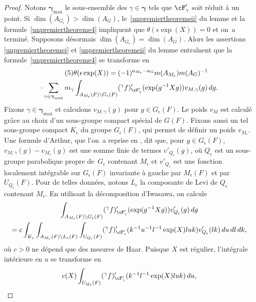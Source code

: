 \begin{proof}
Notons $\boldsymbol{\gamma}_{\max}$ le sous-ensemble des $\gamma\in \boldsymbol{\gamma}$ tels que $\cF'_{\gamma}$ soit réduit à un point. Si $\dim(A_{G_{\epsilon}})\!>\!\dim(A_{G})$, le~\eqref{unpremiertheoremeii} du lemme et la formule~\eqref{unpremiertheoreme4} impliquent que \hbox{$\theta(\epsilon \exp(X))\!=\!0$} et on~a terminé. Supposons désormais $\dim(A_{G_{\epsilon}})=\dim(A_{G})$. Alors les assertions \eqref{unpremiertheoremei} et \eqref{unpremiertheoremeii} du lemme entraînent que la formule~\eqref{unpremiertheoreme4} se transforme en
\begin{multline*}\tag{5}\label{unpremiertheoreme5}
\theta(\epsilon \exp(X))=(-1)^{a_{M_{\epsilon}}-a_{G}}m(A_{M_{\epsilon}})m(A_{G})^{-1}\\
\cdot\sum_{\gamma\in \boldsymbol{\gamma}_{\max}}m_{\gamma}
\int_{A_{M_{\epsilon}}(F)\backslash G_{\epsilon}(F)}(^{\gamma}f)'_{\cF'_{\gamma}}(\exp(g^{-1}X g))v_{M,\gamma} (g)\,dg.
\end{multline*}
Fixons $\gamma\in \boldsymbol{\gamma}_{\max}$ et calculons $v_{M,\gamma}(g)$ pour $g\in G_{\epsilon}(F)$. Le poids $v_{M}$ est calculé grâce au choix d'un sous-groupe compact spécial de $G(F)$. Fixons aussi un tel sous-groupe compact $K_{\epsilon}$ du groupe $G_{\epsilon}(F)$, qui permet de définir un poids $v_{M_{\epsilon}}$. Une formule d'Arthur, que l'on~a reprise en \cite[Lem.\,3.3]{W1}, dit que, pour $g\in G_{\epsilon}(F)$, $v_{M,\gamma}(g)-v_{M_{\epsilon}}(g)$ est une somme finie de termes $v'_{Q_{\epsilon}}(g)$, où $Q_{\epsilon}$ est un sous-groupe parabolique propre de~$G_{\epsilon}$ contenant $M_{\epsilon}$ et $v'_{Q_{\epsilon}}$ est une fonction localement intégrable sur $G_{\epsilon}(F)$ invariante à gauche par $M_{\epsilon}(F)$ et par $U_{Q_{\epsilon}}(F)$. Pour de telles données, notons $L_{\epsilon}$ la composante de Levi de $Q_{\epsilon}$ contenant $M_{\epsilon}$. En utilisant la décomposition d'Iwasawa, on calcule
\begin{multline*}
\int_{A_{M_{\epsilon}}(F)\backslash G_{\epsilon}(F)}(^{\gamma}f)'_{\cF'_{\gamma}}(\exp(g^{-1}X g))v_{Q_{\epsilon}}' (g)\,dg\\
=c\int_{K_{\epsilon}}\int_{A_{M_{\epsilon}}(F)\backslash L_{\epsilon}(F)}\int_{U_{Q_{\epsilon}}(F)}(^{\gamma}f)'_{\cF'_{\gamma}}(k^{-1}u^{-1}l^{-1}\exp(X)luk)v'_{Q_{\epsilon}}(lk)\,du\,dl\,dk,
\end{multline*}
où $c>0$ ne dépend que des mesures de Haar. Puisque $X$ est régulier, l'intégrale intérieure en $u$ se transforme en
\[
c(X)\int_{U_{Q_{\epsilon}}(F)}(^{\gamma}f)'_{\cF'_{\gamma}}(k^{-1}l^{-1}\exp(X)luk)\, du,
\]
\end{proof}
